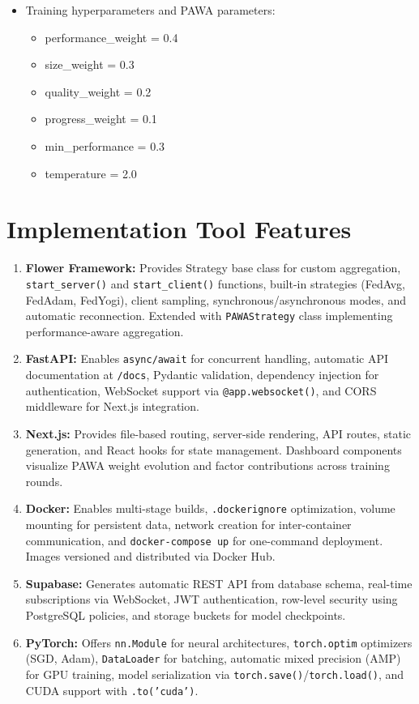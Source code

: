 \begin{description}
\begin{itemize}
        \item Training hyperparameters and PAWA parameters:
        \begin{itemize}
            \item performance\_weight = 0.4
            \item size\_weight = 0.3
            \item quality\_weight = 0.2
            \item progress\_weight = 0.1
            \item min\_performance = 0.3
            \item temperature = 2.0
        \end{itemize}
    \end{itemize}
\end{description}

\section{Implementation Tool Features}
\begin{enumerate}
    \item \textbf{Flower Framework:} Provides Strategy base class for custom aggregation, \texttt{start\_server()} and \texttt{start\_client()} functions, built-in strategies (FedAvg, FedAdam, FedYogi), client sampling, synchronous/asynchronous modes, and automatic reconnection. Extended with \texttt{PAWAStrategy} class implementing performance-aware aggregation.
    \item \textbf{FastAPI:} Enables \texttt{async/await} for concurrent handling, automatic API documentation at \texttt{/docs}, Pydantic validation, dependency injection for authentication, WebSocket support via \texttt{@app.websocket()}, and CORS middleware for Next.js integration.
    \item \textbf{Next.js:} Provides file-based routing, server-side rendering, API routes, static generation, and React hooks for state management. Dashboard components visualize PAWA weight evolution and factor contributions across training rounds.
    \item \textbf{Docker:} Enables multi-stage builds, \texttt{.dockerignore} optimization, volume mounting for persistent data, network creation for inter-container communication, and \texttt{docker-compose up} for one-command deployment. Images versioned and distributed via Docker Hub.
    \item \textbf{Supabase:} Generates automatic REST API from database schema, real-time subscriptions via WebSocket, JWT authentication, row-level security using PostgreSQL policies, and storage buckets for model checkpoints.
    \item \textbf{PyTorch:} Offers \texttt{nn.Module} for neural architectures, \texttt{torch.optim} optimizers (SGD, Adam), \texttt{DataLoader} for batching, automatic mixed precision (AMP) for GPU training, model serialization via \texttt{torch.save()}/\texttt{torch.load()}, and CUDA support with \texttt{.to('cuda')}.
\end{enumerate}

